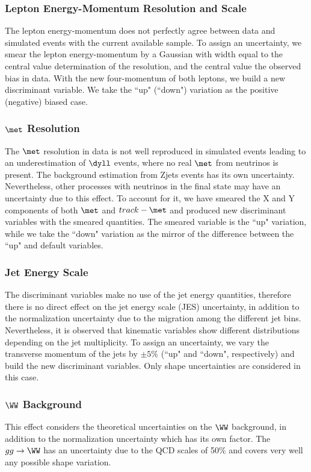 \subsubsection{Lepton Energy-Momentum Resolution and Scale}
The lepton energy-momentum does not perfectly agree between data and simulated
events with the current available sample. To assign an uncertainty, we smear 
the lepton energy-momentum by a Gaussian with width equal to the central value 
determination of the resolution, and the central value the observed bias in
data. With the new four-momentum of both leptons, we build a new discriminant
variable. We take the ``up" (``down") variation as the positive (negative) biased
case.

\subsubsection{$\met$ Resolution}
The $\met$ resolution in data is not well reproduced in simulated events leading
to an underestimation of $\dyll$ events, where no real $\met$ from neutrinos is
present. The background estimation from Zjets events has its own uncertainty.
Nevertheless, other processes with neutrinos in the final state may have an
uncertainty due to this effect. To account for it, we have smeared the X and Y
components of both $\met$ and $track-\met$ and produced new discriminant
variables with the smeared quantities. The smeared variable is the ``up"
variation, while we take the ``down" variation as the mirror of the difference
between the ``up" and default variables.

\subsubsection{Jet Energy Scale}
The discriminant variables make no use of the jet energy quantities, therefore
there is no direct effect on the jet energy scale (JES) uncertainty, in addition
to the normalization uncertainty due to the migration among the different jet
bins. Nevertheless, it is observed that kinematic variables show different
distributions depending on the jet multiplicity. To assign an uncertainty,
we vary the transverse momentum of the jets by $\pm 5\%$ (``up" and ``down",
respectively) and build the new discriminant variables. Only shape uncertainties are 
considered in this case.

\subsubsection{$\WW$ Background}
This effect considers the theoretical uncertainties on the $\WW$ background, in
addition to the normalization uncertainty which has its own factor. The 
$gg \to \WW$ has an uncertainty due to the QCD scales of 50\% and covers very
well any possible shape variation.

